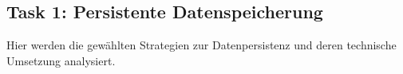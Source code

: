 \subsection{Task 1: Persistente Datenspeicherung}
\label{subsec:results_t1}

Hier werden die gewählten Strategien zur Datenpersistenz und deren technische Umsetzung analysiert.

%
